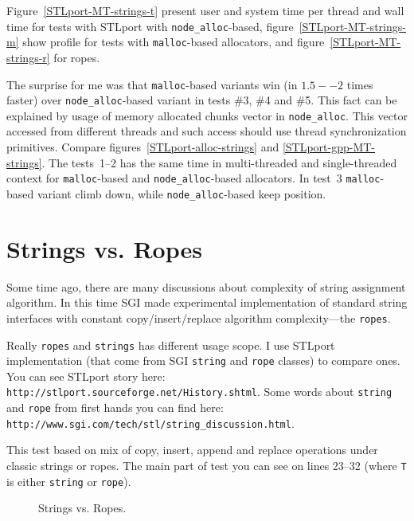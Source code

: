\documentclass[a4paper]{article}
\begin{document}
Figure~\ref{STLport-MT-strings-t} present user and system time per thread
and wall time for tests with STLport with
\texttt{node\_alloc}-based,
figure~\ref{STLport-MT-strings-m} show profile for tests with \texttt{malloc}-based allocators, and figure~\ref{STLport-MT-strings-r} for ropes.

The surprise for me was that \texttt{malloc}-based variants
win (in $1.5--2$ times faster) over \texttt{node\_alloc}-based variant in tests \#3,
\#4 and \#5.
This fact can be explained by usage of memory allocated chunks vector
in \texttt{node\_alloc}. This vector accessed from different threads
and such access should use thread synchronization primitives.
Compare figures~\ref{STLport-alloc-strings} and \ref{STLport-gpp-MT-strings}.
The tests~1--2 has the same time in multi-threaded and single-threaded context for
\texttt{malloc}-based and \texttt{node\_alloc}-based allocators.
In test~3 \texttt{malloc}-based variant climb down, while
\texttt{node\_alloc}-based keep position. 

\section{Strings vs. Ropes}

Some time ago, there are many discussions about complexity
of string assignment algorithm.
In this time 
SGI made experimental implementation of standard string interfaces
with constant copy/insert/replace algorithm complexity---the \texttt{ropes}.

Really \texttt{ropes} and \texttt{strings} has different usage scope.
I use STLport implementation (that come from SGI \texttt{string} and \texttt{rope}
classes) to compare ones. You can see STLport story here:
\texttt{http://stlport.sourceforge.net/History.shtml}.
Some words about \texttt{string} and \texttt{rope}
from first hands you can find here:\\
\texttt{http://www.sgi.com/tech/stl/string\_discussion.html}.

This test based on mix of copy, insert, append and replace
operations under classic strings or ropes. The main part
of test you can see on lines 23--32 (where \texttt{T} is
either \texttt{string} or \texttt{rope}).



\begin{figure}
  \begin{center}
    
  \end{center}
  \caption{Strings vs. Ropes.\label{STLport-rope-string}}
\end{figure}
\end{document}
